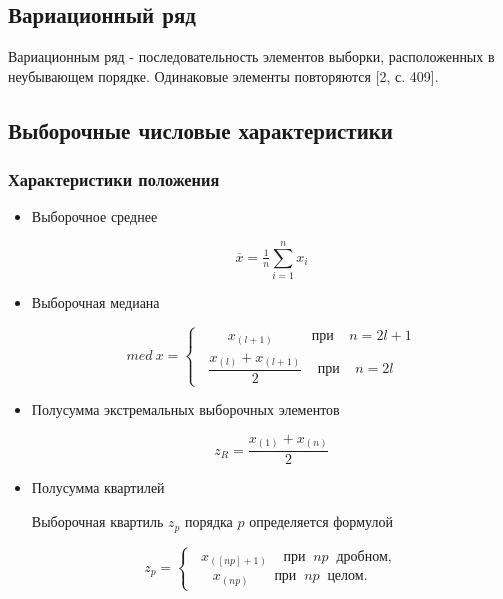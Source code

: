 \documentclass{article}
\begin{document}
\subsection{Вариационный ряд}
Вариационным ряд - последовательность элементов выборки, расположенных в неубывающем порядке. Одинаковые элементы повторяются [2, с. 409].

\subsection{Выборочные числовые характеристики}

\subsubsection{Характеристики положения}

\begin{itemize}
  \item Выборочное среднее
  
  \begin{equation} \label{eq:mean}
    \overline{x} = \tfrac{1}{n}\sum\limits_{i=1}^n x_i
  \end{equation}
  
  \item Выборочная медиана
  
  \begin{equation} \label{eq:med}
    med \: x = 
    \begin{cases} 
        \;\;\;\;\;\;\; x_{(l+1)} \:\;\;\;\;\;\;\;\;\; \text{при} \;\;\;\; n = 2l + 1\\
        \;\; \dfrac{x_{(l)} + x_{(l+1)}}{2} \;\;\;\; \text{при} \;\;\;\; n = 2l
    \end{cases}
  \end{equation}
  
  \item Полусумма экстремальных выборочных элементов
  
  \begin{equation} \label{eq:zR}
    z_R = \dfrac{x_{(1)} + x_{(n)}}{2}
  \end{equation}
  
  \item Полусумма квартилей
  
  Выборочная квартиль $z_p$ порядка $p$ определяется формулой
  
   \begin{equation}
    z_p =
    \begin{cases}
        \;\; x_{([np]+1)} \;\;\;\; \text{при} \;\; np \;\; \text{дробном},\\
        \;\;\;\;\; x_{(np)} \,\:\;\;\;\;\; \text{при} \;\; np \;\; \text{целом}.
    \end{cases}
  \end{equation}
  

\end{itemize}
\end{document}
